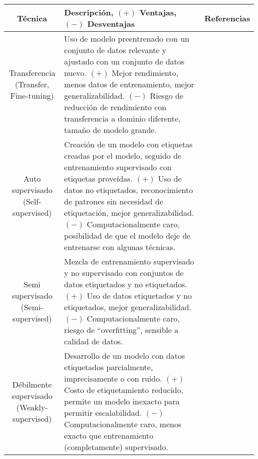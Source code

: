 \begin{center}
    \vspace{-\topsep}
    \begin{table}[h!]
        \footnotesize
        \begin{tabular}{ |c|m{9.5cm}|c| }
            \hline
            \bf Técnica & \bf Descripción, $(+)$ Ventajas, $(-)$ Desventajas & \bf Referencias \\
            \hline
            \makecell{Transferencia \\ (Transfer, Fine-tuning)} & Uso de modelo preentrenado con un conjunto de datos
            relevante y ajustado con un conjunto de datos nuevo. $(+)$ Mejor rendimiento, menos datos de entrenamiento,
            mejor generalizabilidad. $(-)$ Riesgo de reducción de rendimiento con transferencia a dominio diferente,
            tamaño de modelo grande. & \makecell{\autocite{safonova-2023,maggiori-2016-0,castelluccio-2015} \\
            \autocite{nogueira-2017,zhong-2016,amato-2023}} \\
            \hline
            \makecell{Auto supervisado \\ (Self-supervised)} & Creación de un modelo con etiquetas creadas por el
            modelo, seguido de entrenamiento supervisado con etiquetas proveídas. $(+)$ Uso de datos no etiquetados,
            reconocimiento de patrones sin necesidad de etiquetación, mejor generalizabilidad. $(-)$ Computacionalmente
            caro, posibilidad de que el modelo deje de entrenarse con algunas técnicas. & \autocite{safonova-2023} \\
            \hline
            \makecell{Semi supervisado \\ (Semi-supervised)} & Mezcla de entrenamiento supervisado y no supervisado con
            conjuntos de datos etiquetados y no etiquetados. $(+)$ Uso de datos etiquetados y no etiquetados, mejor
            generalizabilidad. $(-)$ Computacionalmente caro, riesgo de \enquote{overfitting}, sensible a calidad de
            datos. & \autocite{safonova-2023} \\
            \hline
            \makecell{Débilmente supervisado \\ (Weakly-supervised)} & Desarrollo de un modelo con datos etiquetados
            parcialmente, imprecisamente o con ruido. $(+)$ Costo de etiquetamiento reducido, permite un modelo
            inexacto para permitir escalabilidad. $(-)$ Computacionalmente caro, menos exacto que entrenamiento
            (completamente) supervisado. & \autocite{safonova-2023} \\

\end{tabular}
\end{table}
\end{center}
